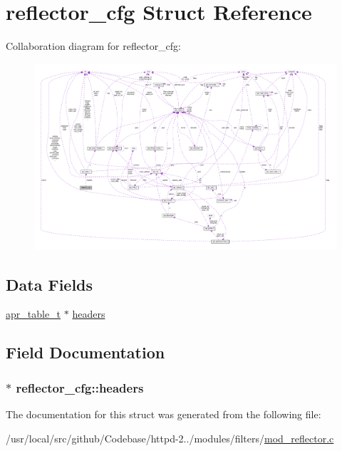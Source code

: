 \hypertarget{structreflector__cfg}{}\section{reflector\+\_\+cfg Struct Reference}
\label{structreflector__cfg}


Collaboration diagram for reflector\+\_\+cfg\+:
\nopagebreak
\begin{figure}[H]
\begin{center}
\leavevmode
\includegraphics[width=350pt]{structreflector__cfg__coll__graph}
\end{center}
\end{figure}
\subsection*{Data Fields}
\begin{DoxyCompactItemize}
\item 
\hyperlink{structapr__table__t}{apr\+\_\+table\+\_\+t} $\ast$ \hyperlink{structreflector__cfg_a7cd7eb7ddef94edd0f6205fba049c693}{headers}
\end{DoxyCompactItemize}


\subsection{Field Documentation}
\subsubsection[{\texorpdfstring{headers}{headers}}]{$\ast$ reflector\+\_\+cfg\+::headers}\hypertarget{structreflector__cfg_a7cd7eb7ddef94edd0f6205fba049c693}{}\label{structreflector__cfg_a7cd7eb7ddef94edd0f6205fba049c693}


The documentation for this struct was generated from the following file\+:\begin{DoxyCompactItemize}
\item 
/usr/local/src/github/\+Codebase/httpd-\/2../modules/filters/\hyperlink{mod__reflector_8c}{mod\+\_\+reflector.\+c}\end{DoxyCompactItemize}

